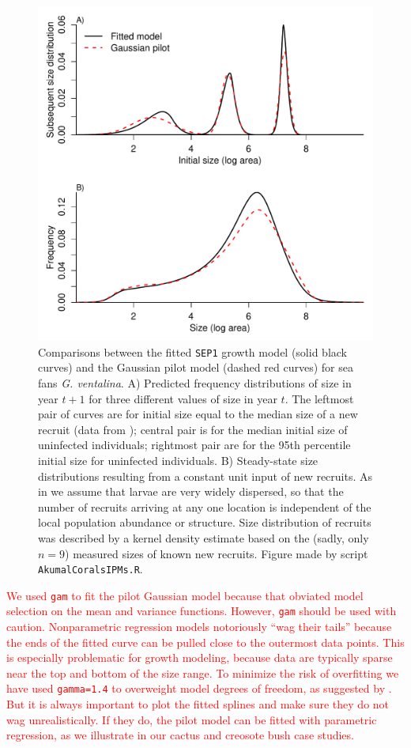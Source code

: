 \documentclass[11pt]{article}
\newcommand{\new}{\textcolor{red}}
\begin{document}
{\begin{figure}[tbp]
\centering
\includegraphics[width=.9\textwidth]{figures/CoralKernelCompare.pdf}
\caption{Comparisons between the fitted \texttt{SEP1} growth model (solid black curves) and the Gaussian pilot model (dashed red curves)
for sea fans \emph{G. ventalina}. A) Predicted frequency distributions of size in year $t+1$ for three different values of size in 
year $t$. The leftmost pair of curves are for initial size equal to the median size of a new recruit (data from \citep{bruno-etal-2011}); 
central pair is for the median initial size of uninfected individuals; rightmost pair are for the 95th percentile initial size for uninfected
individuals. B) Steady-state size distributions resulting from a constant unit input of new recruits. As in \citet{bruno-etal-2011} we
assume that larvae are very widely dispersed, so that the number of recruits arriving at any one location is independent of the local population
abundance or structure. Size distribution of recruits was described by a kernel density estimate based on the (sadly, only $n=9$) measured sizes
of known new recruits. Figure made by script \texttt{AkumalCoralsIPMs.R}.}
\label{fig:CoralKernelCompare}
\end{figure}  

\new{We used \texttt{gam} to fit the pilot Gaussian model because that obviated model selection on the mean and variance functions.
However, \texttt{gam} should be used with caution. Nonparametric regression models notoriously ``wag their tails'' because the ends of 
the fitted curve can be pulled close to the outermost data points. This is especially problematic for growth modeling, because data are typically 
sparse near the top and bottom of the size range. To minimize the risk of overfitting we have used \texttt{gamma=1.4} to overweight
model degrees of freedom, as suggested by \citet[][sec. 3.2]{gu-2013}. But it is always important to 
plot the fitted splines and make sure they do not wag unrealistically. If they do, the pilot model 
can be fitted with parametric regression, as we illustrate in our cactus and creosote bush case studies.}

}
\end{document}
